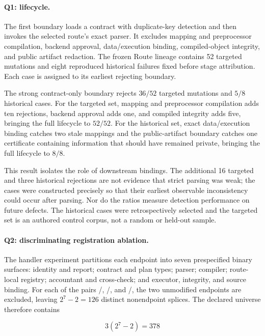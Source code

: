 \paragraph{Q1: lifecycle.}
The first boundary loads a contract with duplicate-key detection and then
invokes the selected route's exact parser.  It excludes mapping and preprocessor
compilation, backend approval, data/execution binding, compiled-object integrity,
and public artifact redaction.  The frozen Route \RouteP{} lineage contains 52
targeted mutations and eight reproduced historical failures fixed before stage
attribution.  Each case is assigned to its earliest rejecting boundary.

The strong contract-only boundary rejects \(36/52\) targeted mutations and
\(5/8\) historical cases.  For the targeted set, mapping and preprocessor
compilation adds ten rejections, backend approval adds one, and compiled integrity
adds five, bringing the full lifecycle to \(52/52\).  For the historical set,
exact data/execution binding catches two stale mappings and the public-artifact
boundary catches one certificate containing information that should have remained
private, bringing the full lifecycle to \(8/8\).

This result isolates the role of downstream bindings.  The additional 16 targeted
and three historical rejections are not evidence that strict parsing was weak; the
cases were constructed precisely so that their earliest observable inconsistency
could occur after parsing.  Nor do the ratios measure detection performance on
future defects.  The historical cases were retrospectively selected and the
targeted set is an authored control corpus, not a random or held-out sample.

\paragraph{Q2: discriminating registration ablation.}
The handler experiment partitions each endpoint into seven prespecified binary
surfaces: identity and report; contract and plan types; parser; compiler;
route-local registry; accountant and cross-check; and executor, integrity, and
source binding.  For each of the pairs \RouteP/\RouteF, \RouteP/\RouteA, and
\RouteF/\RouteA, the two unmodified endpoints are excluded, leaving
\(2^7-2=126\) distinct nonendpoint splices.  The declared universe therefore
contains

\begin{equation}
    3\left(2^7-2\right)=378
\label{eq:ch3-handler-lattice}
\end{equation}


